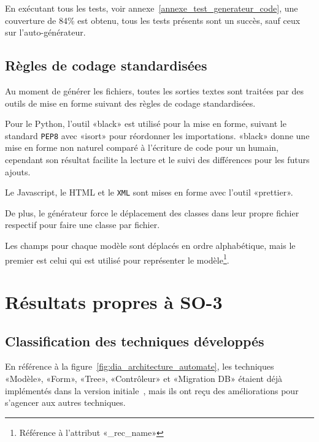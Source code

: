 En exécutant tous les tests, voir annexe~\ref{annexe_test_generateur_code}, une couverture de 84\% est obtenu, tous les tests présents sont un succès, sauf ceux sur l’auto-générateur.

\subsection {Règles de codage standardisées}

Au moment de générer les fichiers, toutes les sorties textes sont traitées par des outils de mise en forme suivant des règles de codage standardisées.

Pour le Python, l’outil «black» est utilisé pour la mise en forme, suivant le standard \texttt{PEP8} avec «isort» pour réordonner les importations. «black» donne une mise en forme non naturel comparé à l’écriture de code pour un humain, cependant son résultat facilite la lecture et le suivi des différences pour les futurs ajouts.

Le Javascript, le HTML et le \texttt{XML} sont mises en forme avec l’outil «prettier».

De plus, le générateur force le déplacement des classes dans leur propre fichier respectif pour faire une classe par fichier.

Les champs pour chaque modèle sont déplacés en ordre alphabétique, mais le premier est celui qui est utilisé pour représenter le modèle\footnote{Référence à l'attribut «\_rec\_name»}.

\section{Résultats propres à SO-3}

\subsection{Classification des techniques développés}

En référence à la figure~\ref{fig:dia_architecture_automate}, les techniques «Modèle», «Form», «Tree», «Contrôleur» et «Migration DB» étaient déjà implémentés dans la version initiale~\cite{bluiksnot_repo}, mais ils ont reçu des améliorations pour s’agencer aux autres techniques.

